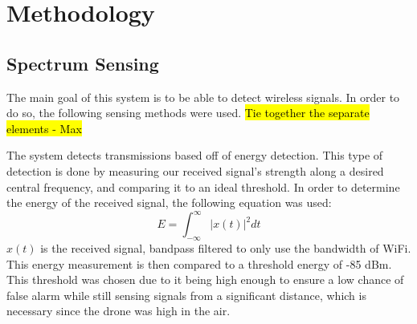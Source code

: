 \chapter{Methodology}
\section{Spectrum Sensing} \label{methods:processing}
The main goal of this system is to be able to detect wireless signals. In order to do so, the following sensing methods were used. \hl{Tie together the separate elements - Max}\par
The system detects transmissions based off of energy detection. This type of detection is done by measuring our received signal’s strength along a desired central frequency, and comparing it to an ideal threshold. In order to determine the energy of the received signal, the following equation was used:
\[E = \int_{-\infty}^{\infty}| x(t) |^2dt\]
$x(t)$ is the received signal, bandpass filtered to only use the bandwidth of WiFi. This energy measurement is then compared to a threshold energy of -85 dBm. This threshold was chosen due to it being high enough to ensure a low chance of false alarm while still sensing signals from a significant distance, which is necessary since the drone was high in the air. \par

